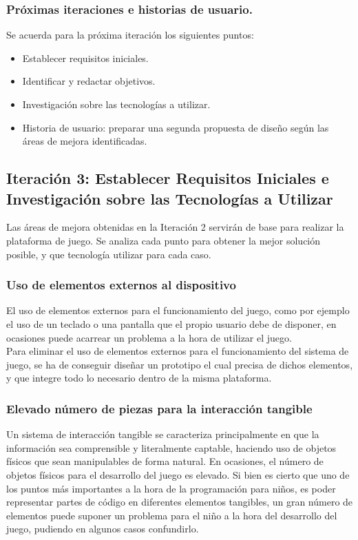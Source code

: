\subsubsection{Próximas iteraciones e historias de usuario.}
Se acuerda para la próxima iteración los siguientes puntos:
\begin{itemize}
\item Establecer requisitos iniciales.
\item Identificar y redactar objetivos.
\item Investigación sobre las tecnologías a utilizar.
\item Historia de usuario: preparar una segunda propuesta de diseño según las áreas de mejora identificadas.
\end{itemize}


\subsection{Iteración 3: Establecer Requisitos Iniciales e Investigación sobre las Tecnologías a Utilizar}

Las áreas de mejora obtenidas en la Iteración 2 servirán de base para realizar la plataforma de juego. Se analiza cada punto para obtener la mejor solución posible, y que tecnología utilizar para cada caso.

\subsubsection{Uso de elementos externos al dispositivo}
El uso de elementos externos para el funcionamiento del juego, como por ejemplo el uso de un teclado o una pantalla que el propio usuario debe de disponer, en ocasiones puede acarrear un problema a la hora de utilizar el juego.\\ 
Para eliminar el uso de elementos externos para el funcionamiento del sistema de juego, se ha de conseguir diseñar un prototipo el cual precisa de dichos elementos, y que integre todo lo necesario dentro de la misma plataforma. 

\subsubsection{Elevado número de piezas para la interacción tangible}
Un sistema de interacción tangible se caracteriza principalmente en que la información sea comprensible y literalmente captable, haciendo uso de objetos físicos que sean manipulables de forma natural. En ocasiones, el número de objetos físicos para el desarrollo del juego es elevado. Si bien es cierto que uno de los puntos más importantes a la hora de la programación para niños, es poder representar partes de código en diferentes elementos tangibles, un gran número de elementos puede suponer un problema para el niño a la hora del desarrollo del juego, pudiendo en algunos casos confundirlo. 


